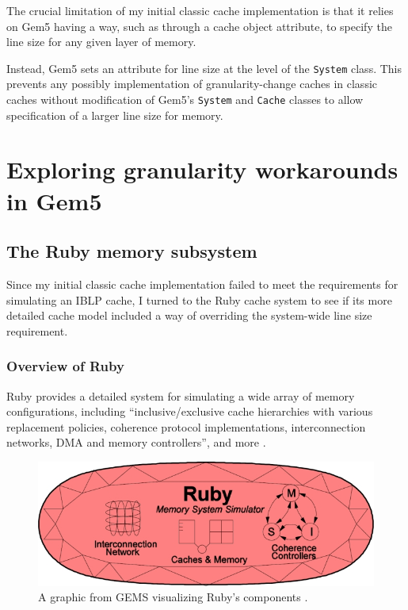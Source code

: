 \documentclass[12pt,twoside]{reedthesis}
\begin{document}
	The crucial limitation of my initial classic cache implementation is that it relies on Gem5 having a way, such as through a cache object attribute, to specify the line size for any given layer of memory.

	Instead, Gem5 sets an attribute for line size at the level of the \verb`System` class. This prevents any possibly implementation of granularity-change caches in classic caches without modification of Gem5's \verb`System` and \verb`Cache` classes to allow specification of a larger line size for memory.


\chapter{Exploring granularity workarounds in Gem5}

\section{The Ruby memory subsystem}

	Since my initial classic cache implementation failed to meet the requirements for simulating an IBLP cache, I turned to the Ruby cache system to see if its more detailed cache model included a way of overriding the system-wide line size requirement.

	\subsection*{Overview of Ruby}

	Ruby provides a detailed system for simulating a wide array of memory configurations, including ``inclusive/exclusive cache hierarchies with various replacement policies, coherence protocol implementations, interconnection networks, DMA and memory controllers'', and more \cite{gem5-ruby}.

	\begin{figure}[h]
		\centering
		\includegraphics[width=4.5in]{figures/ruby.jpg}
		\caption{A graphic from GEMS visualizing Ruby's components \cite{gem5-ruby}.}
	\end{figure}
\end{document}
